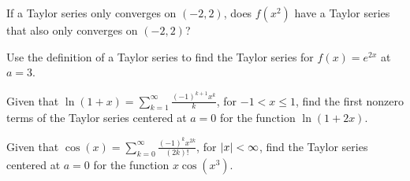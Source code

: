 \documentclass[../mathNotesPreamble]{subfiles}
\begin{document}
    \begin{ex*}[\textcolor{blue}{LC 30.6}]
      If a Taylor series only converges on $(-2,2)$, does $f(x^2)$ have a Taylor series that also only converges on $(-2,2)$?
    \end{ex*}
    \vspace*{2\baselineskip}
    \pagebreak

    \begin{ex*}[\textcolor{blue}{LC 30.7}]
      Use the definition of a Taylor series to find the Taylor series for $f(x)=e^{2x}$ at $a=3$.
    \end{ex*}
    \pagebreak

    \begin{ex*}[\textcolor{blue}{LC 30.8}]
      Given that $\displaystyle \ln(1+x)=\sum_{k=1}^\infty \frac{(-1)^{k+1}x^k}{k}$, for $-1<x\leq 1$, find the first nonzero terms of the Taylor series centered at $a=0$ for the function $\ln(1+2x)$.
    \end{ex*}
    \pagebreak

    \begin{ex*}[\textcolor{blue}{LC 30.9}]
      Given that $\displaystyle\cos(x)=\sum_{k=0}^\infty \frac{(-1)^k x^{2k}}{(2k)!}$, for ${\left\vert x\right\vert}<\infty$, find the Taylor series centered at $a=0$ for the function $x\cos(x^3)$.
    \end{ex*}
    \pagebreak
\end{document}
